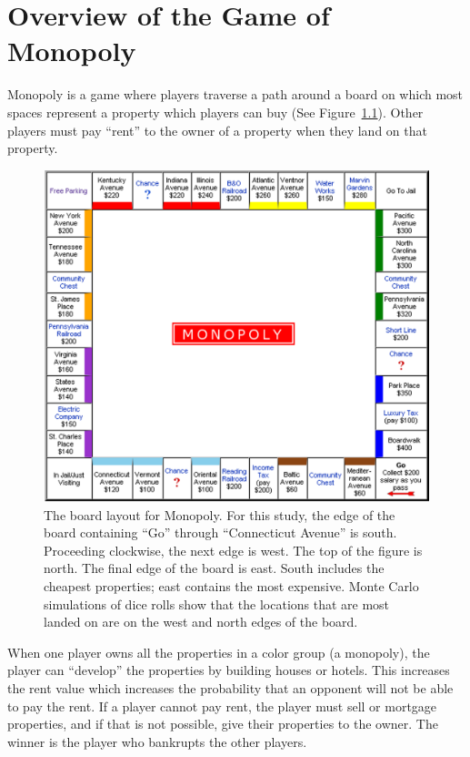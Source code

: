\clearpage
\chapter{Overview of the Game of Monopoly}\label{chap:monopoly}

Monopoly is a game where players traverse a path around a board on which most
spaces represent a property which players can buy (See
Figure~\ref{figure-monoboard}). Other players must pay ``rent'' to the owner of
a property when they land on that property.

\begin{figure}[htp]
\centerline{\includegraphics[width=1.0\columnwidth]{Figures/Monopoly.png}}
\caption[Board layout for Monopoly]{The board layout for Monopoly. For this
study, the edge of the board containing ``Go'' through ``Connecticut Avenue'' is
south. Proceeding clockwise, the next edge is west. The top of the figure is
north. The final edge of the board is east. South includes the cheapest
properties; east contains the most expensive. Monte Carlo simulations of dice
rolls show that the locations that are most landed on are on the west and north
edges of the board.}
\label{figure-monoboard}
\end{figure}

When one player owns all the properties in a color group (a monopoly), the
player can ``develop'' the properties by building houses or hotels. This
increases the rent value which increases the probability that an opponent will
not be able to pay the rent. If a player cannot pay rent, the player must sell
or mortgage properties, and if that is not possible, give their properties to
the owner. The winner is the player who bankrupts the other players.

